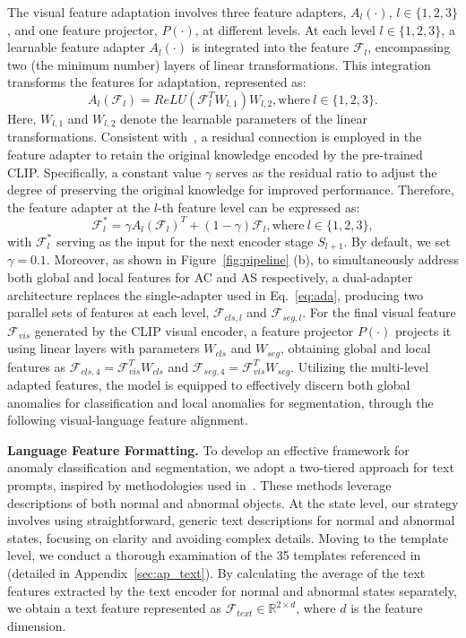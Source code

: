 The visual feature adaptation involves three feature adapters, $A_l(\cdot)$, $l\in\{1,2,3\}$, and one feature projector, $P(\cdot)$, at different levels. At each level $l\in\{1,2,3\}$, a learnable feature adapter $A_l(\cdot)$ is integrated into the feature $\mathcal{F}_l$, encompassing two (the minimum number) layers of linear transformations. This integration transforms the features for adaptation, represented as:
\begin{equation}\label{eq:ada}
    A_l(\mathcal{F}_l) = ReLU(\mathcal{F}_l^T W_{l,1})W_{l,2}, \text{where}~l\in\{1,2,3\}.
\end{equation}
Here, $W_{l,1}$ and $W_{l,2}$ denote the learnable parameters of the linear transformations. Consistent with~\cite{gao2023clip}, a residual connection is employed in the feature adapter to retain the original knowledge encoded by the pre-trained CLIP. Specifically, a constant value $\gamma$ serves as the residual ratio to adjust the degree of preserving the original knowledge for improved performance. Therefore, the feature adapter at the $l$-th feature level can be expressed as:
\begin{equation}
    \mathcal{F}_l^* =\gamma A_l(\mathcal{F}_l)^T + (1-\gamma)\mathcal{F}_l,\text{where}~l\in\{1,2,3\},
\end{equation}
with $\mathcal{F}_l^*$ serving as the input for the next encoder stage $S_{l+1}$. By default, we set $\gamma=0.1$. Moreover, as shown in Figure~\ref{fig:pipeline} (b), to simultaneously address both global and local features for AC and AS respectively, a dual-adapter architecture replaces the single-adapter used in Eq.~\eqref{eq:ada}, producing two parallel sets of features at each level, $\mathcal{F}_{cls,l}$ and $\mathcal{F}_{seg,l}$. For the final visual feature $\mathcal{F}_{vis}$ generated by the CLIP visual encoder, a feature projector $P(\cdot)$ projects it using linear layers with parameters $W_{cls}$ and $W_{seg}$, obtaining global and local features as $\mathcal{F}_{cls,4}=\mathcal{F}_{vis}^T W_{cls}$ and $\mathcal{F}_{seg,4}=\mathcal{F}_{vis}^T W_{seg}$. Utilizing the multi-level adapted features, the model is equipped to effectively discern both global anomalies for classification and local anomalies for segmentation, through the following visual-language feature alignment.

\noindent\textbf{Language Feature Formatting.} 
To develop an effective framework for anomaly classification and segmentation, we adopt a two-tiered approach for text prompts, inspired by methodologies used in~\cite{winclip,chen2023zero}. These methods leverage descriptions of both normal and abnormal objects. At the state level, our strategy involves using straightforward, generic text descriptions for normal and abnormal states, focusing on clarity and avoiding complex details. Moving to the template level, we conduct a thorough examination of the 35 templates referenced in~\cite{deng2009imagenet} (detailed in Appendix~\ref{sec:ap_text}). By calculating the average of the text features extracted by the text encoder for normal and abnormal states separately, we obtain a text feature represented as $\mathcal{F}_{text} \in \mathbb{R}^{2\times d}$, where $d$ is the feature dimension. 

